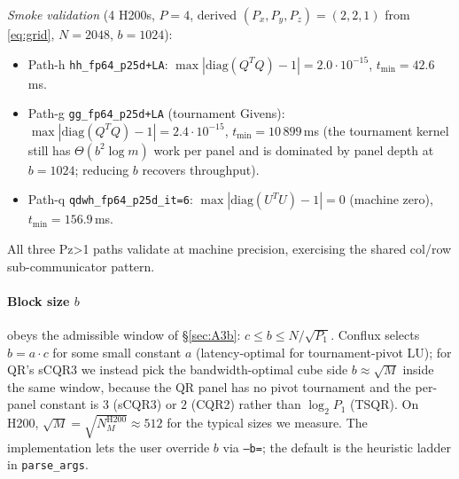 \documentclass[11pt]{article}
\begin{document}
\emph{Smoke validation} (4 H200s, $P=4$, derived $(P_x, P_y, P_z) =
(2, 2, 1)$ from \eqref{eq:grid}, $N=2048$, $b=1024$):
\begin{itemize}[leftmargin=2em, itemsep=0.15em]
  \item Path-h \texttt{hh\_fp64\_p25d+LA}:
        $\max|\mathrm{diag}(Q^T Q) - 1| = 2.0\!\cdot\!10^{-15}$,
        $t_{\min} = 42.6$\,ms.
  \item Path-g \texttt{gg\_fp64\_p25d+LA} (tournament Givens):
        $\max|\mathrm{diag}(Q^T Q) - 1| = 2.4\!\cdot\!10^{-15}$,
        $t_{\min} = 10\,899$\,ms (the tournament kernel still has
        $\Theta(b^2 \log m)$ work per panel and is dominated by panel
        depth at $b=1024$; reducing $b$ recovers throughput).
  \item Path-q \texttt{qdwh\_fp64\_p25d\_it=6}:
        $\max|\mathrm{diag}(U^T U) - 1| = 0$ (machine zero),
        $t_{\min} = 156.9$\,ms.
\end{itemize}
All three Pz>1 paths validate at machine precision, exercising the
shared col/row sub-communicator pattern.

\paragraph{Block size $b$} obeys the admissible window of \S\ref{sec:A3b}:
$c \le b \le N/\sqrt{P_1}$.  Conflux selects $b = a \cdot c$ for some
small constant $a$ (latency-optimal for tournament-pivot LU); for QR's
sCQR3 we instead pick the bandwidth-optimal cube side
$b \approx \sqrt{M}$ inside the same window, because the QR panel has
no pivot tournament and the per-panel constant is $3$ (sCQR3) or
$2$ (CQR2) rather than $\log_2 P_1$ (TSQR).  On H200,
$\sqrt{M} = \sqrt{N_M^{\text{H200}}} \approx 512$ for the typical
sizes we measure.  The implementation lets the user override $b$ via
\texttt{--b=}; the default is the heuristic ladder in
\texttt{parse\_args}.
\end{document}
